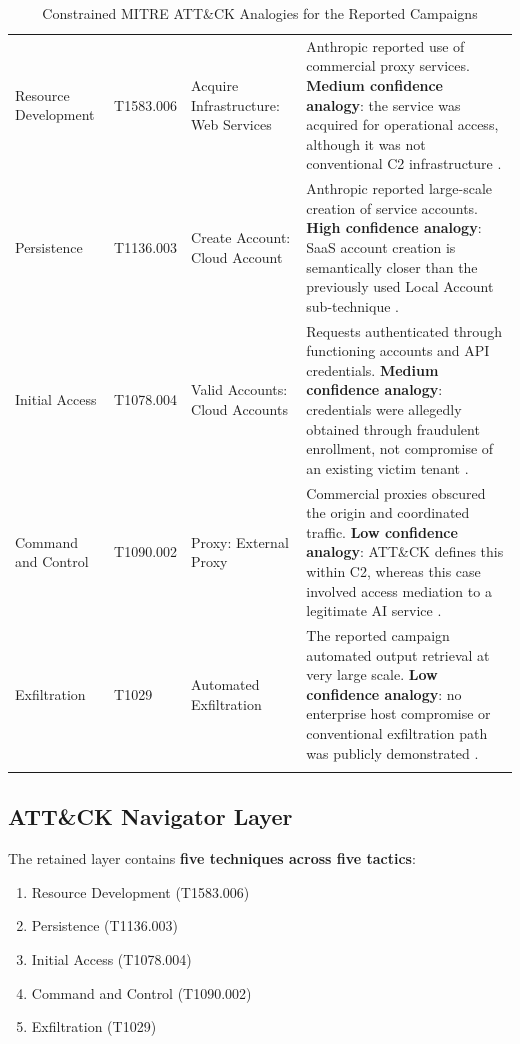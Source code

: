 \documentclass[11pt,a4paper]{article}
\begin{document}
\begin{longtable}{|p{2.5cm}|p{1.8cm}|p{3.2cm}|p{6.8cm}|}
Resource Development & T1583.006 & Acquire Infrastructure: Web Services & Anthropic reported use of commercial proxy services. \textbf{Medium confidence analogy}: the service was acquired for operational access, although it was not conventional C2 infrastructure \cite{anthropic_blog}. \\
\rowcolor{rowgray}
Persistence & T1136.003 & Create Account: Cloud Account & Anthropic reported large-scale creation of service accounts. \textbf{High confidence analogy}: SaaS account creation is semantically closer than the previously used Local Account sub-technique \cite{anthropic_blog}. \\
Initial Access & T1078.004 & Valid Accounts: Cloud Accounts & Requests authenticated through functioning accounts and API credentials. \textbf{Medium confidence analogy}: credentials were allegedly obtained through fraudulent enrollment, not compromise of an existing victim tenant \cite{anthropic_blog}. \\
\rowcolor{rowgray}
Command and Control & T1090.002 & Proxy: External Proxy & Commercial proxies obscured the origin and coordinated traffic. \textbf{Low confidence analogy}: ATT\&CK defines this within C2, whereas this case involved access mediation to a legitimate AI service \cite{anthropic_blog}. \\
Exfiltration & T1029 & Automated Exfiltration & The reported campaign automated output retrieval at very large scale. \textbf{Low confidence analogy}: no enterprise host compromise or conventional exfiltration path was publicly demonstrated \cite{anthropic_blog}. \\

\caption{Constrained MITRE ATT\&CK Analogies for the Reported Campaigns}
\label{tab:attack_map}
\end{longtable}

\subsection{ATT\&CK Navigator Layer}

The retained layer contains \textbf{five techniques across five tactics}:

\begin{enumerate}[leftmargin=20pt, noitemsep]
    \item Resource Development (T1583.006)
    \item Persistence (T1136.003)
    \item Initial Access (T1078.004)
    \item Command and Control (T1090.002)
    \item Exfiltration (T1029)
\end{enumerate}
\end{document}
